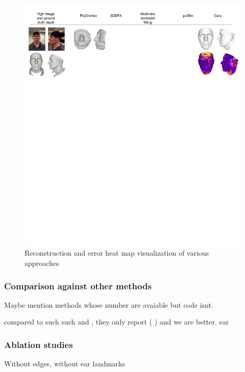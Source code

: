 \documentclass[10pt,twocolumn,letterpaper]{article}
\begin{document}
\begin{figure}
\begin{center}
   \includegraphics[width=0.95\linewidth]{images/ICCV_verticals.png}
\end{center}
  \caption{Reconstruction and error heat map visualization of various approaches}
\label{fig:results}
\end{figure}

\subsubsection{Comparison against other methods}
Maybe mention methods whose number are avaiable but code isnt.

compared to such such and , they only report ( ) and we are better. 
ear     
\subsubsection{Ablation studies}
Without edges, without ear landmarks
\end{document}

